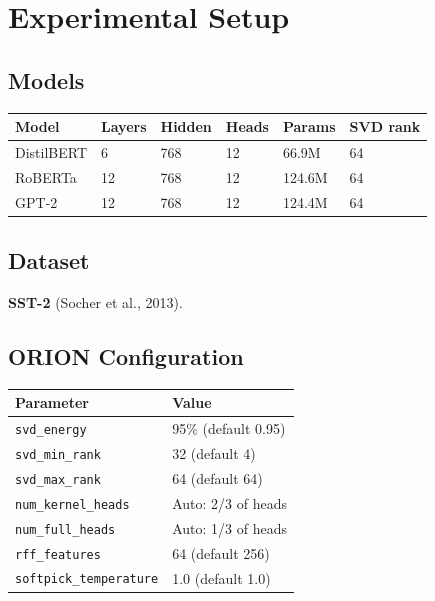 
\section{Experimental Setup}

\subsection{Models}

\begin{table}[H]
\centering
\small
\begin{tabular}{llllll}
\toprule
\textbf{Model} & \textbf{Layers} & \textbf{Hidden} & \textbf{Heads} & \textbf{Params} & \textbf{SVD rank} \\
\midrule
DistilBERT & 6 & 768 & 12 & 66.9M & 64 \\
RoBERTa & 12 & 768 & 12 & 124.6M & 64 \\
GPT-2 & 12 & 768 & 12 & 124.4M & 64 \\
\bottomrule
\end{tabular}
\end{table}

\subsection{Dataset}

\textbf{SST-2} (Socher et al., 2013).

\subsection{ORION Configuration}

\begin{table}[H]
\centering
\small
\begin{tabular}{ll}
\toprule
\textbf{Parameter} & \textbf{Value} \\
\midrule
\texttt{svd\_energy} & 95\% (default 0.95) \\
\texttt{svd\_min\_rank} & 32 (default 4) \\
\texttt{svd\_max\_rank} & 64 (default 64) \\
\texttt{num\_kernel\_heads} & Auto: 2/3 of heads \\
\texttt{num\_full\_heads} & Auto: 1/3 of heads \\
\texttt{rff\_features} & 64 (default 256) \\
\texttt{softpick\_temperature} & 1.0 (default 1.0) \\
\bottomrule
\end{tabular}
\end{table}

